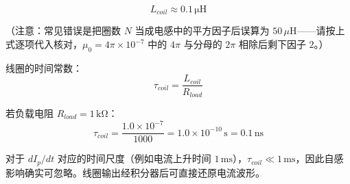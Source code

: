 \[
    \boxed{L_{coil} \approx 0.1\,\mathrm{\mu H}}
\]

（注意：常见错误是把圈数 $N$ 当成电感中的平方因子后误算为 $50\,\mu\mathrm{H}$——请按上式逐项代入核对，$\mu_0=4\pi\times10^{-7}$ 中的 $4\pi$ 与分母的 $2\pi$ 相除后剩下因子 $2$。）

线圈的时间常数：
\[
    \tau_{coil} = \frac{L_{coil}}{R_{load}}
\]

若负载电阻 $R_{load}=1\,\mathrm{k\Omega}$：
\[
    \tau_{coil} = \frac{1.0\times10^{-7}}{1000} = 1.0\times10^{-10}\,\mathrm{s} = 0.1\,\mathrm{ns}
\]

对于 $dI_p/dt$ 对应的时间尺度（例如电流上升时间 $1\,\mathrm{ms}$），$\tau_{coil} \ll 1\,\mathrm{ms}$，因此自感影响确实可忽略。线圈输出经积分器后可直接还原电流波形。


